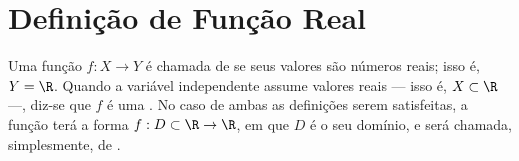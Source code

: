 \section{Definição de Função Real}

\begin{definition}
    Uma função $f: X \to Y$ é chamada de  se seus valores são números reais; isso é, $Y = \R$.
    Quando a variável independente assume valores reais --- isso é, $X \subset \R$ ---, diz-se que $f$ é uma .
    No caso de ambas as definições serem satisfeitas, a função terá a forma $f : D \subset \R \to \R$, em que $D$ é o seu domínio, e será chamada, simplesmente, de .
\end{definition}
